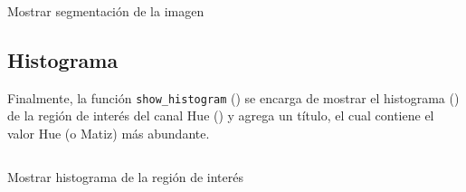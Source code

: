 \begin{listing}[!ht]
\inputminted{python}{code_listings/show_segmentation.py}
\caption{Mostrar segmentación de la imagen}
\label{code:show_segmentation}
\end{listing}

\subsection{Histograma}
Finalmente, la función \texttt{show\_histogram} () se encarga de mostrar el histograma () de la región de interés del canal Hue () y agrega un título, el cual contiene el valor Hue (o Matiz) más abundante.

\begin{listing}[!ht]
\inputminted{python}{code_listings/show_histogram.py}
\caption{Mostrar histograma de la región de interés}
\label{code:show_histogram}
\end{listing}